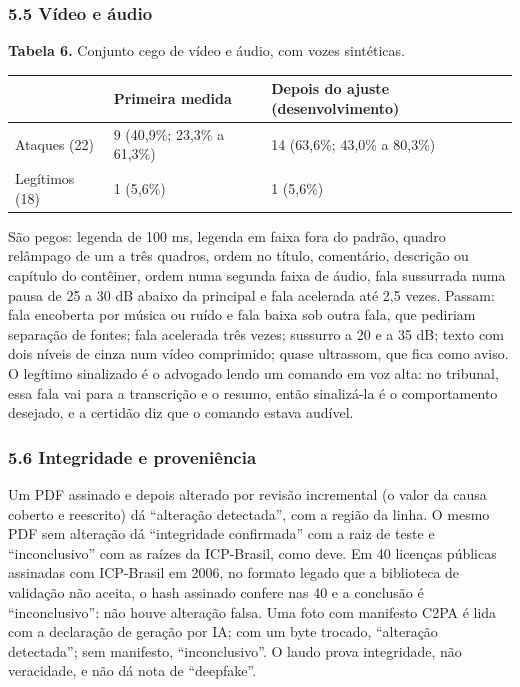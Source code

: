 \documentclass[
  brazilian,
  11pt,
]{article}
\newcounter{none} %
\begin{document}
\subsubsection{5.5 Vídeo e áudio}\label{vuxeddeo-e-uxe1udio}

\textbf{Tabela 6.} Conjunto cego de vídeo e áudio, com vozes sintéticas.

{\def\LTcaptype{none} %
\begin{longtable}[]{@{}lll@{}}
\toprule\noalign{}
& Primeira medida & Depois do ajuste (desenvolvimento) \\
\midrule\noalign{}
\endhead
\bottomrule\noalign{}
\endlastfoot
Ataques (22) & 9 (40,9\%; 23,3\% a 61,3\%) & 14 (63,6\%; 43,0\% a
80,3\%) \\
Legítimos (18) & 1 (5,6\%) & 1 (5,6\%) \\
\end{longtable}
}

São pegos: legenda de 100 ms, legenda em faixa fora do padrão, quadro
relâmpago de um a três quadros, ordem no título, comentário, descrição
ou capítulo do contêiner, ordem numa segunda faixa de áudio, fala
sussurrada numa pausa de 25 a 30 dB abaixo da principal e fala acelerada
até 2,5 vezes. Passam: fala encoberta por música ou ruído e fala baixa
sob outra fala, que pediriam separação de fontes; fala acelerada três
vezes; sussurro a 20 e a 35 dB; texto com dois níveis de cinza num vídeo
comprimido; quase ultrassom, que fica como aviso. O legítimo sinalizado
é o advogado lendo um comando em voz alta: no tribunal, essa fala vai
para a transcrição e o resumo, então sinalizá-la é o comportamento
desejado, e a certidão diz que o comando estava audível.

\subsubsection{5.6 Integridade e
proveniência}\label{integridade-e-proveniuxeancia}

Um PDF assinado e depois alterado por revisão incremental (o valor da
causa coberto e reescrito) dá ``alteração detectada'', com a região da
linha. O mesmo PDF sem alteração dá ``integridade confirmada'' com a
raiz de teste e ``inconclusivo'' com as raízes da ICP-Brasil, como deve.
Em 40 licenças públicas assinadas com ICP-Brasil em 2006, no formato
legado que a biblioteca de validação não aceita, o hash assinado confere
nas 40 e a conclusão é ``inconclusivo'': não houve alteração falsa. Uma
foto com manifesto C2PA é lida com a declaração de geração por IA; com
um byte trocado, ``alteração detectada''; sem manifesto,
``inconclusivo''. O laudo prova integridade, não veracidade, e não dá
nota de ``deepfake''.
\end{document}
